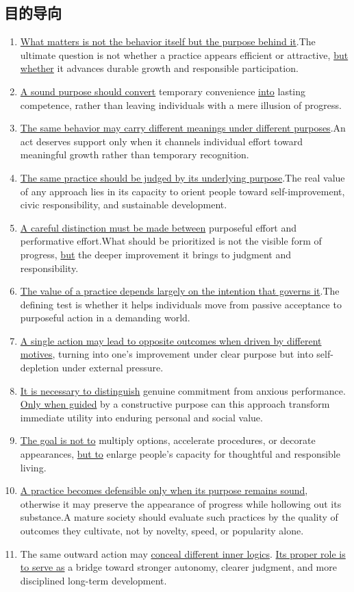 \subsection{目的导向}

\begin{enumerate}
    \item \underline{What matters is not the behavior itself but the purpose behind it}.The ultimate question is not whether a practice appears efficient or attractive, \underline{but whether} it advances durable growth and responsible participation.
    \item \underline{A sound purpose should convert} temporary convenience \underline{into} lasting competence, rather than leaving individuals with a mere illusion of progress.
    \item \underline{The same behavior may carry different meanings under different purposes}.An act deserves support only when it channels individual effort toward meaningful growth rather than temporary recognition.
    \item \underline{The same practice should be judged by its underlying purpose}.The real value of any approach lies in its capacity to orient people toward self-improvement, civic responsibility, and sustainable development.
    \item \underline{A careful distinction must be made between} purposeful effort and performative effort.What should be prioritized is not the visible form of progress, \underline{but} the deeper improvement it brings to judgment and responsibility.
    \item \underline{The value of a practice depends largely on the intention that governs it}.The defining test is whether it helps individuals move from passive acceptance to purposeful action in a demanding world.
    \item \underline{A single action may lead to opposite outcomes when driven by different motives}, turning into one's improvement under clear purpose but into self-depletion under external pressure.
    \item \underline{It is necessary to distinguish} genuine commitment from anxious performance. \underline{Only when guided} by a constructive purpose can this approach transform immediate utility into enduring personal and social value.
    \item \underline{The goal is not to} multiply options, accelerate procedures, or decorate appearances, \underline{but to} enlarge people's capacity for thoughtful and responsible living.
    \item \underline{A practice becomes defensible only when its purpose remains sound}, otherwise it may preserve the appearance of progress while hollowing out its substance.A mature society should evaluate such practices by the quality of outcomes they cultivate, not by novelty, speed, or popularity alone.
    \item The same outward action may  \underline{conceal different inner logics}. \underline{Its proper role is to serve as} a bridge toward stronger autonomy, clearer judgment, and more disciplined long-term development.
\end{enumerate}


